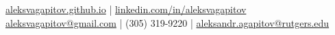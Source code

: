 \documentclass[]{Resume}
\begin{document}
%
%

%
%
{ 
\href{https://aleksvagapitov.github.io/}{aleksvagapitov.github.io} | \href{https://www.linkedin.com/in/aleksvagapitov/}{linkedin.com/in/aleksvagapitov}\\
\href{mailto:aleksvagapitov@gmail.com}{aleksvagapitov@gmail.com} | (305) 319-9220 | \href{mailto:aleksandr.agapitov@rutgers.edu}{aleksandr.agapitov@rutgers.edu} \\
}

%
%
\end{document}
